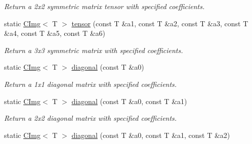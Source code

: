 \begin{DoxyCompactItemize}
\begin{DoxyCompactList}\small\item\em Return a 2x2 symmetric matrix tensor with specified coefficients. \item\end{DoxyCompactList}\item 
\hypertarget{structcimg__library_1_1CImg_ae8efd27c5a0259e3d183d187066daa81}{
static \hyperlink{structcimg__library_1_1CImg}{CImg}$<$ T $>$ \hyperlink{structcimg__library_1_1CImg_ae8efd27c5a0259e3d183d187066daa81}{tensor} (const T \&a1, const T \&a2, const T \&a3, const T \&a4, const T \&a5, const T \&a6)}
\label{structcimg__library_1_1CImg_ae8efd27c5a0259e3d183d187066daa81}

\begin{DoxyCompactList}\small\item\em Return a 3x3 symmetric matrix with specified coefficients. \item\end{DoxyCompactList}\item 
\hypertarget{structcimg__library_1_1CImg_afaba9e417e4dc79a30ca192e17e1f4d8}{
static \hyperlink{structcimg__library_1_1CImg}{CImg}$<$ T $>$ \hyperlink{structcimg__library_1_1CImg_afaba9e417e4dc79a30ca192e17e1f4d8}{diagonal} (const T \&a0)}
\label{structcimg__library_1_1CImg_afaba9e417e4dc79a30ca192e17e1f4d8}

\begin{DoxyCompactList}\small\item\em Return a 1x1 diagonal matrix with specified coefficients. \item\end{DoxyCompactList}\item 
\hypertarget{structcimg__library_1_1CImg_a583389fd7581839ef6c9eda2c2e75720}{
static \hyperlink{structcimg__library_1_1CImg}{CImg}$<$ T $>$ \hyperlink{structcimg__library_1_1CImg_a583389fd7581839ef6c9eda2c2e75720}{diagonal} (const T \&a0, const T \&a1)}
\label{structcimg__library_1_1CImg_a583389fd7581839ef6c9eda2c2e75720}

\begin{DoxyCompactList}\small\item\em Return a 2x2 diagonal matrix with specified coefficients. \item\end{DoxyCompactList}\item 
\hypertarget{structcimg__library_1_1CImg_af89435259d190fe6b390cde30664ea0c}{
static \hyperlink{structcimg__library_1_1CImg}{CImg}$<$ T $>$ \hyperlink{structcimg__library_1_1CImg_af89435259d190fe6b390cde30664ea0c}{diagonal} (const T \&a0, const T \&a1, const T \&a2)}
\label{structcimg__library_1_1CImg_af89435259d190fe6b390cde30664ea0c}


\end{DoxyCompactItemize}
